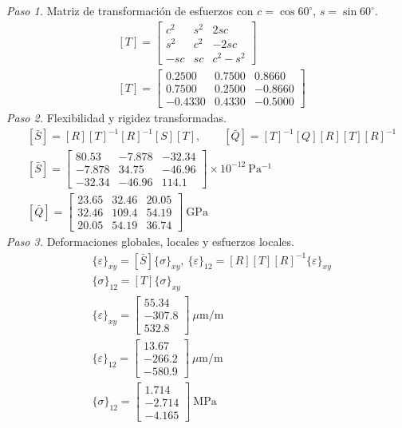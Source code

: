 \documentclass[11pt]{article}
\begin{document}
\textit{Paso 1.} Matriz de transformación de esfuerzos con $c=\cos 60^\circ$, $s=\sin 60^\circ$.
\begin{align*}
&[T]=\begin{bmatrix}c^2 & s^2 & 2sc\\ s^2 & c^2 & -2sc\\ -sc & sc & c^2-s^2\end{bmatrix} \\
&[T]=\begin{bmatrix}0.2500 & 0.7500 & 0.8660 \\ 0.7500 & 0.2500 & -0.8660 \\ -0.4330 & 0.4330 & -0.5000\end{bmatrix}
\end{align*}
\textit{Paso 2.} Flexibilidad y rigidez transformadas.
\begin{align*}
&[\bar S]=[R][T]^{-1}[R]^{-1}[S][T],\qquad [\bar Q]=[T]^{-1}[Q][R][T][R]^{-1} \\
&[\bar S]=\begin{bmatrix}80.53 & -7.878 & -32.34 \\ -7.878 & 34.75 & -46.96 \\ -32.34 & -46.96 & 114.1\end{bmatrix}\times10^{-12}\ \mathrm{Pa^{-1}} \\
&[\bar Q]=\begin{bmatrix}23.65 & 32.46 & 20.05 \\ 32.46 & 109.4 & 54.19 \\ 20.05 & 54.19 & 36.74\end{bmatrix}\ \mathrm{GPa}
\end{align*}
\textit{Paso 3.} Deformaciones globales, locales y esfuerzos locales.
\begin{align*}
&\{\varepsilon\}_{xy}=[\bar S]\{\sigma\}_{xy},\ \{\varepsilon\}_{12}=[R][T][R]^{-1}\{\varepsilon\}_{xy} \\
&\{\sigma\}_{12}=[T]\{\sigma\}_{xy} \\
&\{\varepsilon\}_{xy}=\begin{bmatrix}55.34 \\ -307.8 \\ 532.8\end{bmatrix}\ \mu\mathrm{m/m} \\
&\{\varepsilon\}_{12}=\begin{bmatrix}13.67 \\ -266.2 \\ -580.9\end{bmatrix}\ \mu\mathrm{m/m} \\
&\{\sigma\}_{12}=\begin{bmatrix}1.714 \\ -2.714 \\ -4.165\end{bmatrix}\ \mathrm{MPa}
\end{align*}
\end{document}
